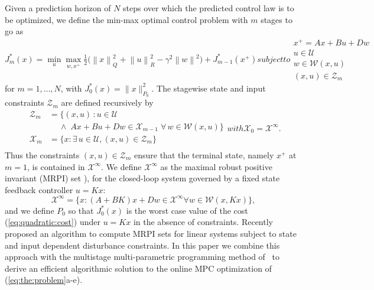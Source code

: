 \documentclass{ifacconf}
\providecommand{\norm}[1]{\left\|#1\right\|}
\begin{document}
Given a prediction horizon of $N$ steps over which the predicted control law is to be optimized, we define the
min-max optimal control problem with $m$ stages to go as
%
\begin{subequations}\label{eq:the:problem}%
\begin{equation}
	J_{m}^\ast(x) = \min_u \max_{w,x^+} \tfrac{1}{2}\bigl(\norm{x}_Q^2+\norm{u}_R^2-\gamma^2
    \norm{w}^2\bigr) + J_{m-1}^\ast(x^+)
\end{equation}
subject to
\begin{gather}
	x^+ = A x + B u + D w\\
	u\in\mathcal U \\
	w\in\mathcal W(x,u) \\
	(x,u)\in\mathcal Z_m
\end{gather}
\end{subequations}
%
for $m=1,\ldots,N$, with $J_0^\ast(x) = \|x\|_{P_0}^2$.
The stagewise  state and input constraints $\mathcal Z_m$ are defined recursively by
%
\begin{subequations}\label{eq:definition:stage:constraints}
\begin{align}
	\mathcal Z_m &= \{(x,u)\,: u\in\mathcal U \nonumber\\
	&\quad\ \wedge \; A x + Bu + Dw\in\mathcal X_{m-1}\; \forall\, w\in\mathcal W(x,u)\} 
	\label{eq:definition:mixed:stage:constraint}\\
	\mathcal X_m &= \{x : \exists\, u\in\mathcal U, (x,u)\in\mathcal Z_m\}
	\label{eq:definition:state:stage:constraint}\\
\end{align}
with
\begin{equation}
	\mathcal X_0 = \mathcal X^\infty .
\end{equation}
\end{subequations}
Thus the constraints $(x,u)\in\mathcal Z_m$ ensure that the terminal state, namely $x^+$ at $m=1$, is
contained in $\mathcal{X}^\infty$. We define $\mathcal{X}^\infty$ as the maximal robust positive invariant (MRPI) set \citep{blanchini:2007}), for the closed-loop system governed by a fixed state feedback controller
$u=Kx$:
%
\begin{equation}\label{eq:definition:MRPI:set}
	\mathcal X^\infty = \{x: (A+BK)x + Dw \in \mathcal X^\infty \forall w\in\mathcal W(x,Kx)\},
\end{equation}
%
and we define $P_0$ so that $J_0^\ast(x)$ is the worst case value of the cost (\ref{eq:quadratic:cost}) under
$u=Kx$ in the absence of constraints.
Recently~\cite{Schaich:2015} proposed an algorithm to compute MRPI sets
for linear systems subject to state and input dependent disturbance constraints. In this paper we combine this approach
with the multistage multi-parametric programming method of~\cite{Buerger:ACC} to derive an efficient algorithmic
solution to the online MPC optimization of (\ref{eq:the:problem}a-e).
\end{document}
